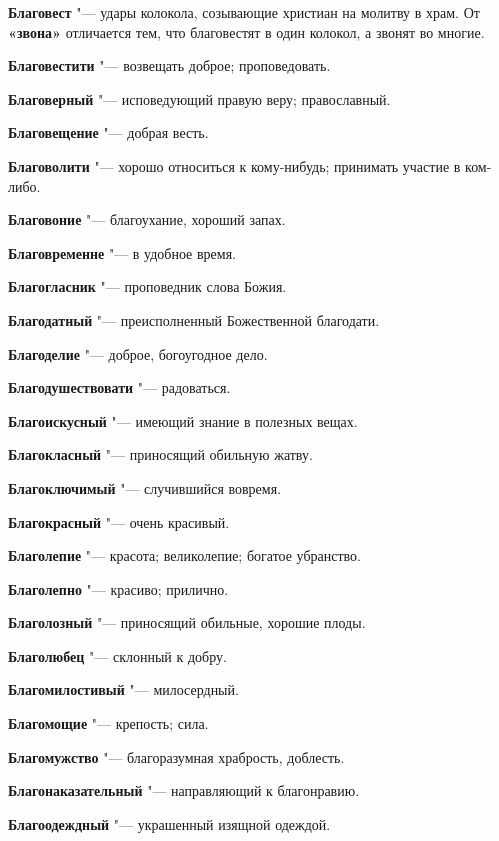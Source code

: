 \begin{mymulticols}
\noindent\textbf{Благовест} "--- удары колокола, созывающие христиан на молитву в храм. От \textbf{«звона»} отличается тем, что благовестят в один колокол, а звонят во многие. 

\noindent\textbf{Благовестити} "--- возвещать доброе; проповедовать. 

\noindent\textbf{Благоверный} "--- исповедующий правую веру; православный. 

\noindent\textbf{Благовещение} "--- добрая весть. 

\noindent\textbf{Благоволити} "--- хорошо относиться к кому-нибудь; принимать участие в ком-либо. 

\noindent\textbf{Благовоние} "--- благоухание, хороший запах. 

\noindent\textbf{Благовременне} "--- в удобное время. 

\noindent\textbf{Благогласник} "--- проповедник слова Божия. 

\noindent\textbf{Благодатный} "--- преисполненный Божественной благодати. 

\noindent\textbf{Благоделие} "--- доброе, богоугодное дело. 

\noindent\textbf{Благодушествовати} "--- радоваться. 

\noindent\textbf{Благоискусный} "--- имеющий знание в полезных вещах. 

\noindent\textbf{Благокласный} "--- приносящий обильную жатву. 

\noindent\textbf{Благоключимый} "--- случившийся вовремя. 

\noindent\textbf{Благокрасный} "--- очень красивый. 

\noindent\textbf{Благолепие} "--- красота; великолепие; богатое убранство. 

\noindent\textbf{Благолепно} "--- красиво; прилично. 

\noindent\textbf{Благолозный} "--- приносящий обильные, хорошие плоды. 

\noindent\textbf{Благолюбец} "--- склонный к добру. 

\noindent\textbf{Благомилостивый} "--- милосердный. 

\noindent\textbf{Благомощие} "--- крепость; сила. 

\noindent\textbf{Благомужство} "--- благоразумная храбрость, доблесть. 

\noindent\textbf{Благонаказательный} "--- направляющий к благонравию. 

\noindent\textbf{Благоодеждный} "--- украшенный изящной одеждой. 


\end{mymulticols}
